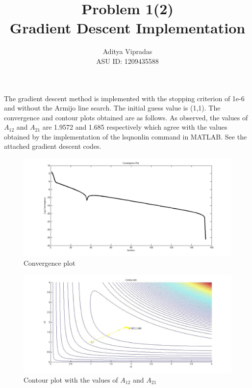 \documentclass[12pt]{article}
\title{\textbf{Problem 1(2)\\Gradient Descent Implementation}}
\author{Aditya Vipradas\\ASU ID: 1209435588}
\begin{document}
\maketitle
The gradient descent method is implemented with the stopping criterion of 1e-6 and without the Armijo line search. The initial guess value is (1,1). The convergence and contour plots obtained are as follows. As observed, the values of $A_{12}$ and $A_{21}$ are 1.9572 and 1.685 respectively which agree with the values obtained by the implementation of the lsqnonlin command in MATLAB. See the attached gradient descent codes.
\begin{figure}[H]
\begin{center}
\includegraphics[scale=0.4]{convergence.jpg}
\caption{Convergence plot}  
\end{center}
\end{figure}
\begin{figure}[H]
\begin{center}
\includegraphics[scale=0.4]{contour.jpg}
\caption{Contour plot with the values of $A_{12}$ and $A_{21}$}  
\end{center}
\end{figure}
\end{document}
